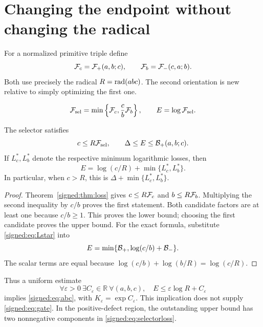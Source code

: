 \section{Changing the endpoint without changing the radical}
For a normalized primitive triple define
\[
 \mathcal F_c=\mathcal F_+(a,b;c),\qquad
 \mathcal F_b=\mathcal F_-(c,a;b).
\]
Both use precisely the radical \(R=\operatorname{rad}(abc)\). The second orientation is new relative to simply optimizing the first one.
\begin{definition}
\[
 \mathcal F_{\mathrm{sel}}=\min\left\{\mathcal F_c,\frac cb\mathcal F_b\right\},\qquad
 E=\log\mathcal F_{\mathrm{sel}}.
\]
\end{definition}
\begin{theorem}\label{signed:thm:selector}
The selector satisfies
\begin{equation}\label{signed:eq:bridge}
 c\le R\mathcal F_{\mathrm{sel}},\qquad
 \Delta\le E\le\mathcal B_+(a,b;c).
\end{equation}
If \(L_c^*,L_b^*\) denote the respective minimum logarithmic losses, then
\begin{equation}\label{signed:eq:selectorloss}
 E=\log(c/R)+\min\{L_c^*,L_b^*\}.
\end{equation}
In particular, when \(c>R\), this is \(\Delta+\min\{L_c^*,L_b^*\}\).
\end{theorem}
\begin{proof}
Theorem~\ref{signed:thm:loss} gives \(c\le R\mathcal F_c\) and \(b\le R\mathcal F_b\). Multiplying the second inequality by \(c/b\) proves the first statement. Both candidate factors are at least one because \(c/b\ge1\). This proves the lower bound; choosing the first candidate proves the upper bound. For the exact formula, substitute \eqref{signed:eq:Lstar} into
\[
 E=\min\{\mathcal B_+,\log(c/b)+\mathcal B_-\}.
\]
The scalar terms are equal because \(\log(c/b)+\log(b/R)=\log(c/R)\).
\end{proof}
Thus a uniform estimate
\begin{equation}\label{signed:eq:gate}
 \forall\varepsilon>0\ \exists C_\varepsilon\in\mathbb R\ \forall(a,b,c),\quad
 E\le\varepsilon\log R+C_\varepsilon
\end{equation}
implies \eqref{signed:eq:abc}, with \(K_\varepsilon=\exp C_\varepsilon\). This implication does not supply \eqref{signed:eq:gate}. In the positive-defect region, the outstanding upper bound has two nonnegative components in \eqref{signed:eq:selectorloss}.


